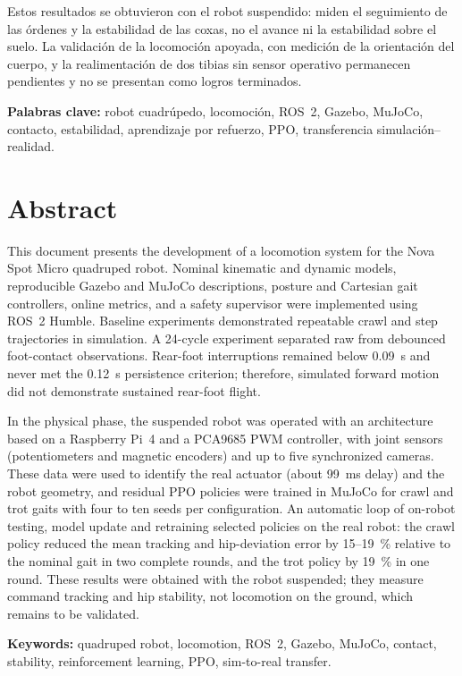 Estos resultados se obtuvieron con el robot suspendido: miden el seguimiento de
las órdenes y la estabilidad de las coxas, no el avance ni la estabilidad sobre
el suelo. La validación de la locomoción apoyada, con medición de la
orientación del cuerpo, y la realimentación de dos tibias sin sensor operativo
permanecen pendientes y no se presentan como logros terminados.

\textbf{Palabras clave:} robot cuadrúpedo, locomoción, ROS~2, Gazebo, MuJoCo,
contacto, estabilidad, aprendizaje por refuerzo, PPO, transferencia
simulación--realidad.

\chapter*{Abstract}

This document presents the development of a locomotion system for the Nova
Spot Micro quadruped robot. Nominal kinematic and dynamic models, reproducible
Gazebo and MuJoCo descriptions, posture and Cartesian gait controllers, online
metrics, and a safety supervisor were implemented using ROS~2 Humble. Baseline
experiments demonstrated repeatable crawl and step trajectories in simulation.
A 24-cycle experiment separated raw from debounced foot-contact observations.
Rear-foot interruptions remained below 0.09~s and never met the 0.12~s
persistence criterion; therefore, simulated forward motion did not demonstrate
sustained rear-foot flight.

In the physical phase, the suspended robot was operated with an architecture
based on a Raspberry Pi~4 and a PCA9685 PWM controller, with joint sensors
(potentiometers and magnetic encoders) and up to five synchronized cameras. These data were used
to identify the real actuator (about 99~ms delay) and the robot geometry, and
residual PPO policies were trained in MuJoCo for crawl and trot gaits with four
to ten seeds per configuration. An automatic loop of on-robot testing, model
update and retraining selected policies on the real robot: the crawl policy
reduced the mean tracking and hip-deviation error by 15--19~\% relative to the
nominal gait in two complete rounds, and the trot policy by 19~\% in one round.
These results were obtained with the robot suspended; they measure command
tracking and hip stability, not locomotion on the ground, which remains to be
validated.

\textbf{Keywords:} quadruped robot, locomotion, ROS~2, Gazebo, MuJoCo,
contact, stability, reinforcement learning, PPO, sim-to-real transfer.
